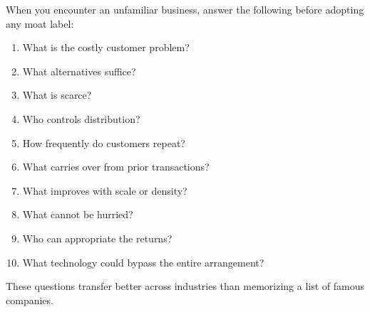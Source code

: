 When you encounter an unfamiliar business, answer the following before adopting any moat label:
\begin{enumerate}
    \item What is the costly customer problem?
    \item What alternatives suffice?
    \item What is scarce?
    \item Who controls distribution?
    \item How frequently do customers repeat?
    \item What carries over from prior transactions?
    \item What improves with scale or density?
    \item What cannot be hurried?
    \item Who can appropriate the returns?
    \item What technology could bypass the entire arrangement?
\end{enumerate}

These questions transfer better across industries than memorizing a list of famous companies.
